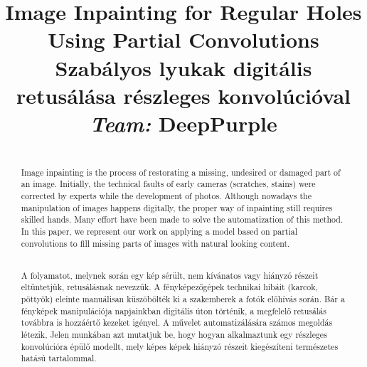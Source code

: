 \documentclass[conference]{IEEEtran}
\begin{document}

\title{Image Inpainting for Regular Holes Using Partial Convolutions\\
	{\large \textbf{Szabályos lyukak digitális retusálása részleges konvolúcióval}}\\
	{\large \textit{Team:} DeepPurple}\\
}

\author{
\and
\and
}

\maketitle

\begin{abstract}\\
Image inpainting is the process of restorating a missing, undesired or damaged part of an image.
Initially, the technical faults of early cameras (scratches, stains) were corrected by experts while the development of photos. 
Although nowadays the manipulation of images happens digitally, the proper way of inpainting still requires skilled hands.
Many effort have been made to solve the automatization of this method. In this paper, we represent our work on applying
a model based on partial convolutions to fill missing parts of images with natural looking content.
\end{abstract}

\begin{abstract}\\
A folyamatot, melynek során egy kép sérült, nem kívánatos vagy hiányzó részeit eltüntetjük, retusálásnak nevezzük.
A fényképezőgépek technikai hibáit (karcok, pöttyök) eleinte manuálisan küszöbölték ki a szakemberek a fotók előhívás során.
Bár a fényképek manipulációja napjainkban digitális úton történik, a megfelelő retusálás továbbra is hozzáértő kezeket igényel.
A művelet automatizálására számos megoldás létezik, Jelen munkában azt mutatjuk be, hogy hogyan alkalmaztunk egy
részleges konvolúcióra épülő modellt, mely képes képek hiányzó részeit kiegészíteni természetes hatású tartalommal.
\end{abstract}
\end{document}
